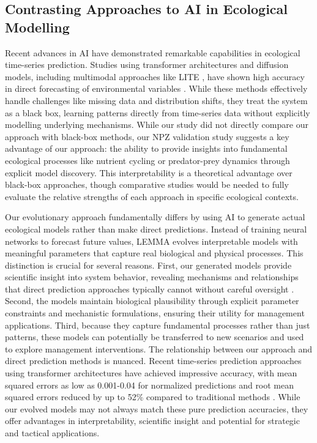 \subsection{Contrasting Approaches to AI in Ecological Modelling}
Recent advances in AI have demonstrated remarkable capabilities in ecological time-series prediction. Studies using transformer architectures and diffusion models, including multimodal approaches like LITE \citep{li2024lite}, have shown high accuracy in direct forecasting of environmental variables \citep{morales2024developing,gandhi2024generative}. While these methods effectively handle challenges like missing data and distribution shifts, they treat the system as a black box, learning patterns directly from time-series data without explicitly modelling underlying mechanisms. While our study did not directly compare our approach with black-box methods, our NPZ validation study suggests a key advantage of our approach: the ability to provide insights into fundamental ecological processes like nutrient cycling or predator-prey dynamics through explicit model discovery. This interpretability is a theoretical advantage over black-box approaches, though comparative studies would be needed to fully evaluate the relative strengths of each approach in specific ecological contexts.

Our evolutionary approach fundamentally differs by using AI to generate actual ecological models rather than make direct predictions. Instead of training neural networks to forecast future values, LEMMA evolves interpretable models with meaningful parameters that capture real biological and physical processes. This distinction is crucial for several reasons. First, our generated models provide scientific insight into system behavior, revealing mechanisms and relationships that direct prediction approaches typically cannot without careful oversight \citep{adams2017model}. Second, the models maintain biological plausibility through explicit parameter constraints and mechanistic formulations, ensuring their utility for management applications. Third, because they capture fundamental processes rather than just patterns, these models can potentially be transferred to new scenarios and used to explore management interventions.
The relationship between our approach and direct prediction methods is nuanced. Recent time-series prediction approaches using transformer architectures have achieved impressive accuracy, with mean squared errors as low as 0.001-0.04 for normalized predictions \citep{morales2024developing} and root mean squared errors reduced by up to 52\% compared to traditional methods \citep{gandhi2024generative}. While our evolved models may not always match these pure prediction accuracies, they offer advantages in interpretability, scientific insight and potential for strategic and tactical applications.

